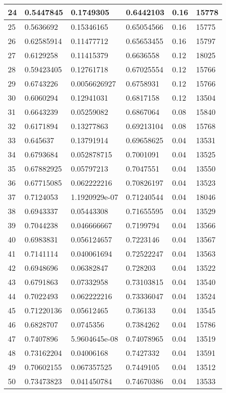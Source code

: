\begin{longtable}{|l|l|l|l|l|l|}
24 & 0.5447845 & 0.1749305 & 0.6442103 & 0.16 & 15778 \\ \hline 
25 & 0.5636692 & 0.15346165 & 0.65054566 & 0.16 & 15775 \\ \hline 
26 & 0.62585914 & 0.11477712 & 0.65653455 & 0.16 & 15797 \\ \hline 
27 & 0.6129258 & 0.11415379 & 0.6636558 & 0.12 & 18025 \\ \hline 
28 & 0.59423405 & 0.12761718 & 0.67025554 & 0.12 & 15766 \\ \hline 
29 & 0.6743226 & 0.0056626927 & 0.6758931 & 0.12 & 15766 \\ \hline 
30 & 0.6060294 & 0.12941031 & 0.6817158 & 0.12 & 13504 \\ \hline 
31 & 0.6643239 & 0.05259082 & 0.6867064 & 0.08 & 15840 \\ \hline 
32 & 0.6171894 & 0.13277863 & 0.69213104 & 0.08 & 15768 \\ \hline 
33 & 0.645637 & 0.13791914 & 0.69658625 & 0.04 & 13531 \\ \hline 
34 & 0.6793684 & 0.052878715 & 0.7001091 & 0.04 & 13525 \\ \hline 
35 & 0.67882925 & 0.05797213 & 0.7047551 & 0.04 & 13550 \\ \hline 
36 & 0.67715085 & 0.062222216 & 0.70826197 & 0.04 & 13523 \\ \hline 
37 & 0.7124053 & 1.1920929e-07 & 0.71240544 & 0.04 & 18046 \\ \hline 
38 & 0.6943337 & 0.05443308 & 0.71655595 & 0.04 & 13529 \\ \hline 
39 & 0.7044238 & 0.046666667 & 0.7199794 & 0.04 & 13566 \\ \hline 
40 & 0.6983831 & 0.056124657 & 0.7223146 & 0.04 & 13567 \\ \hline 
41 & 0.7141114 & 0.040061694 & 0.72522247 & 0.04 & 13563 \\ \hline 
42 & 0.6948696 & 0.06382847 & 0.728203 & 0.04 & 13522 \\ \hline 
43 & 0.6791863 & 0.07332958 & 0.73103815 & 0.04 & 13540 \\ \hline 
44 & 0.7022493 & 0.062222216 & 0.73336047 & 0.04 & 13524 \\ \hline 
45 & 0.71220136 & 0.05612465 & 0.736133 & 0.04 & 13545 \\ \hline 
46 & 0.6828707 & 0.0745356 & 0.7384262 & 0.04 & 15786 \\ \hline 
47 & 0.7407896 & 5.9604645e-08 & 0.74078965 & 0.04 & 13519 \\ \hline 
48 & 0.73162204 & 0.04006168 & 0.7427332 & 0.04 & 13591 \\ \hline 
49 & 0.70602155 & 0.067357525 & 0.7449105 & 0.04 & 13512 \\ \hline 
50 & 0.73473823 & 0.041450784 & 0.74670386 & 0.04 & 13533 \\ \hline 
\end{longtable}